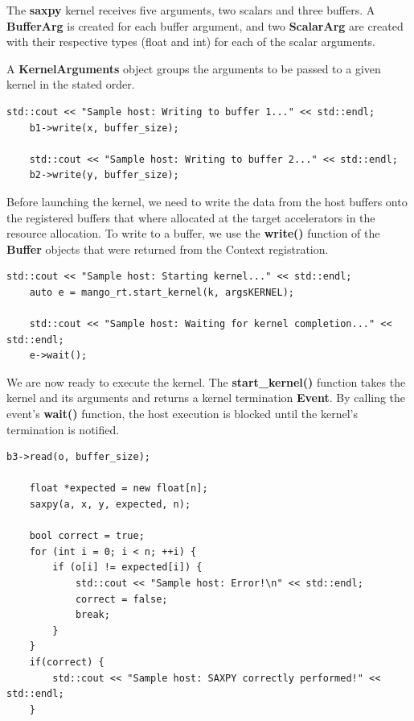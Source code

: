 The \textbf{saxpy} kernel receives five arguments, two scalars and three buffers. A \textbf{BufferArg} is created for each buffer argument, and two \textbf{ScalarArg} are created with their respective types (float and int) for each of the scalar arguments.

A \textbf{KernelArguments} object groups the arguments to be passed to a given kernel in the stated order.

\begin{lstlisting}[style=CStyle, caption=Sample - Writing buffers]
    std::cout << "Sample host: Writing to buffer 1..." << std::endl;
    b1->write(x, buffer_size);

    std::cout << "Sample host: Writing to buffer 2..." << std::endl;
    b2->write(y, buffer_size);
\end{lstlisting}

Before launching the kernel, we need to write the data from the host buffers onto the registered buffers that where allocated at the target accelerators in the resource allocation. To write to a buffer, we use the \textbf{write()} function of the \textbf{Buffer} objects that were returned from the Context registration.
    
\begin{lstlisting}[style=CStyle, caption=Sample - Kernel launch]
    std::cout << "Sample host: Starting kernel..." << std::endl;
    auto e = mango_rt.start_kernel(k, argsKERNEL);

    std::cout << "Sample host: Waiting for kernel completion..." << std::endl;
    e->wait();
\end{lstlisting}

We are now ready to execute the kernel. The \textbf{start\_kernel()} function takes the kernel and its arguments and returns a kernel termination \textbf{Event}. By calling the event's \textbf{wait()} function, the host execution is blocked until the kernel's termination is notified.

\begin{lstlisting}[style=CStyle, caption=Sample - Checking results]
    b3->read(o, buffer_size);

    float *expected = new float[n];
    saxpy(a, x, y, expected, n);

    bool correct = true;
    for (int i = 0; i < n; ++i) {
        if (o[i] != expected[i]) {
            std::cout << "Sample host: Error!\n" << std::endl;
            correct = false;
            break;
        }
    }
    if(correct) {
        std::cout << "Sample host: SAXPY correctly performed!" << std::endl;
    }
\end{lstlisting}

